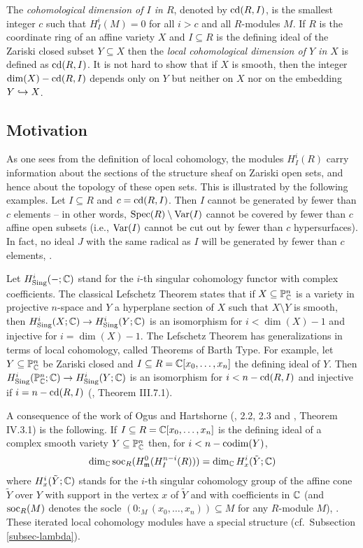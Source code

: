 The {\em
cohomological dimension of $I$ in $R$},  denoted by $\operatorname{cd}(R,I)$, is the
smallest integer $c$ such that 
$H^i_I(M)=0$ for all $i>c$ and all $R$-modules $M$. If $R$ is the
coordinate ring of an affine variety $X$ and $I\subseteq R$ is the defining
ideal of the Zariski closed subset $Y\subseteq X$ then the {\em local
cohomological dimension of $Y$ in $X$}   is defined as $\operatorname{cd}(R,I)$.
It is not hard to show that if $X$ is smooth, then the integer
$\dim(X)-\operatorname{cd}(R,I)$ depends only on $Y$ but neither on $X$ nor on the
embedding $Y\hookrightarrow X$. 
%
\subsection{Motivation} 
As one sees from the definition of local cohomology, the
modules $H^i_I(R)$ carry information about the sections of the
structure sheaf on Zariski open sets, and hence about the topology of
these open sets.
This is illustrated by the following examples. Let $I\subseteq
R$ and $c=\operatorname{cd}(R,I)$. Then 
$I$ cannot be generated by fewer than $c$ elements -- in other words,
$\operatorname{Spec}(R)\setminus \operatorname{Var}(I)$ cannot be covered by fewer than $c$ affine
open subsets (i.e., $\operatorname{Var}(I)$ cannot be cut out by fewer than $c$
hypersurfaces).  In fact, no ideal $J$ 
with the same radical as $I$ will be generated by fewer than $c$
elements, \cite{DM:B-S}.

Let $H^i_{{\rm Sing}}(-;{\mathbb C})$ stand for the $i$-th singular cohomology
functor with complex coefficients. 
The classical
Lefschetz Theorem  \cite{DM:Gri-Har}
states that if $X\subseteq {\mathbb P}^n_{\mathbb C}$ is a
 variety in projective $n$-space 
and $Y$ a hyperplane section of $X$ such that $X\setminus Y$
is smooth, 
then $H^i_{{\rm Sing}}(X;{\mathbb C})\to
H^i_{{\rm Sing}}(Y;{\mathbb C})$ is an isomorphism for $i<\dim (X)-1$ and injective for
$i=\dim (X)-1$. 
The Lefschetz Theorem has generalizations in terms of local
cohomology, called Theorems of Barth Type.
For example, let $Y\subseteq {\mathbb P}_{\mathbb C}^n$ be Zariski 
closed
and $I\subseteq 
R={\mathbb C}[x_0,\ldots,x_n]$ the 
defining ideal of $Y$. 
Then $H^i_{{\rm Sing}}({\mathbb P}^n_{\mathbb C};{\mathbb C})\to H^i_{{\rm Sing}}(Y;{\mathbb C})$ is an isomorphism for $i<
n-\operatorname{cd}(R,I)$ and injective if $i=n-\operatorname{cd}(R,I)$ (\cite{DM:DRCAV}, Theorem III.7.1).

A consequence of the work of Ogus and Hartshorne
(\cite{DM:Og}, 2.2, 2.3 and \cite{DM:DRCAV}, Theorem IV.3.1) is the
following. 
If $I\subseteq
R={\mathbb C}[x_0,\ldots,x_n]$ is the defining 
ideal of a complex smooth variety $Y\subseteq {\mathbb P}^n_{\mathbb C}$ then, for
$i<n-\operatorname{codim} (Y)$,
\[
\dim_{\mathbb C}\operatorname{soc}_R
(H^0_{\mathfrak m}(H^{n-i}_I (R)))=\dim_{\mathbb C} H^i_x(\tilde Y;{\mathbb C})
\]
where
$H^i_x(\tilde 
Y;{\mathbb C})$ stands for the $i$-th singular cohomology group of the affine
cone $\tilde Y$ over $Y$ with support in the vertex $x$ of $\tilde Y$ and
with coefficients in ${\mathbb C}$ (and $\operatorname{soc}_R(M)$  denotes the socle
$(0:_M(x_0,\ldots,x_n))\subseteq M$ for any 
$R$-module $M$), \cite{DM:L-Dmod}. 
These iterated local cohomology modules have a
special structure (cf.\ Subsection \ref{subsec-lambda}).

